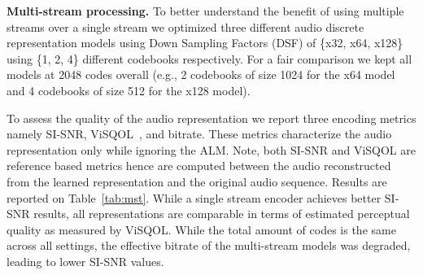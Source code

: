 \begin{table}[t!]
\centering \small
\caption{\label{tab:mst} Multi-stream results: we report two sets of results encoding and generation. For the encoding metrics we report Bitrate (kbps), SI-SNR (dBs), and ViSQOL. For the generation scores we report FAD, KL and inference speed-up. We additionally include the number of streams and the Down Sampling Factor (DSF). Notice, the encoding metrics are the same for the large and base model as the same audio representation model was used.
}
\end{table}

{\noindent \bf{Multi-stream processing.}} To better understand the benefit of using multiple streams over a single stream we optimized three different audio discrete representation models using Down Sampling Factors (DSF) of \{x32, x64, x128\} using \{1, 2, 4\} different codebooks respectively. For a fair comparison we kept all models at 2048 codes overall (e.g., 2 codebooks of size 1024 for the x64 model and 4 codebooks of size 512 for the x128 model). 

To assess the quality of the audio representation we report three encoding metrics namely \ac{SI-SNR}, ViSQOL~\citep{chinen2020visqol}, and bitrate. These metrics characterize the audio representation only while ignoring the \ac{ALM}. Note, both \ac{SI-SNR} and ViSQOL are reference based metrics hence are computed between the audio reconstructed from the learned representation and the original audio sequence. Results are reported on Table~\ref{tab:mst}. While a single stream encoder achieves better \ac{SI-SNR} results, all representations are comparable in terms of estimated perceptual quality as measured by ViSQOL. While the total amount of codes is the same across all settings, the effective bitrate of the multi-stream models was degraded, leading to lower \ac{SI-SNR} values. 

